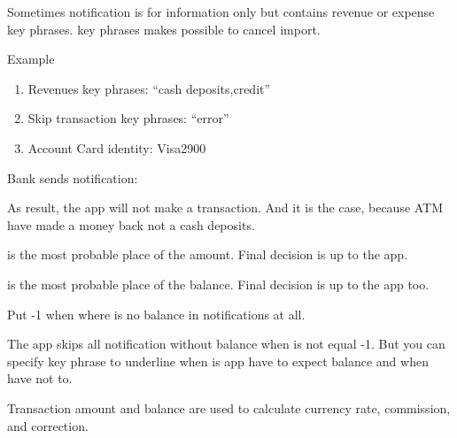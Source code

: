 \documentclass[a4paper,10pt,english]{sphinxmanual}
\begin{document}
Sometimes notification is for information only but contains revenue or expense key phrases.
 key phrases makes possible to cancel import.

Example
\begin{enumerate}
\def\theenumi{\arabic{enumi}}
\def\labelenumi{\theenumi .}
\makeatletter\def\p@enumii{\p@enumi \theenumi .}\makeatother
\item {} 
Revenues key phrases: “cash deposits,credit”

\item {} 
Skip transaction key phrases: “error”

\item {} 
Account Card identity: Visa2900

\end{enumerate}

Bank sends notification:

\begin{sphinxVerbatim}[commandchars=\\\{\}]
             
\end{sphinxVerbatim}

As result, the app will not make a transaction. And it is the case, because ATM have made a money back not
a cash deposits.

 is the most probable place of the amount. Final
decision is up to the app.

 is the most probable place of the balance. Final
decision is up to the app too.

Put -1 when where is no balance in notifications at all.

The app skips all notification without balance when  is not equal -1.
But you can specify key phrase to underline when is app have to expect balance and when have not to.

Transaction amount and balance are used to calculate currency rate, commission, and correction.
\end{document}
